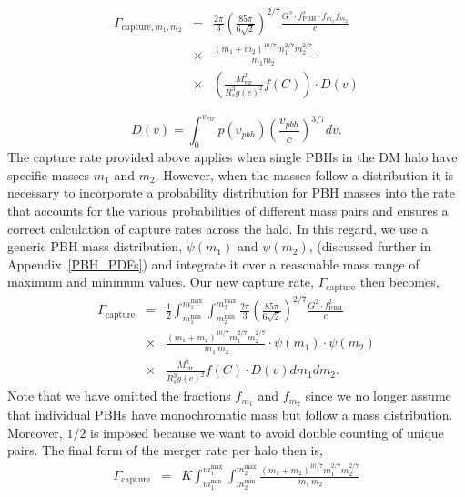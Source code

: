 \documentclass[aps, prd, reprint, nofootinbib]{revtex4-2}
\begin{document}
\begin{appendix}
\begin{eqnarray}
\Gamma_{\textrm{capture}, m_1, m_2} &=& 
\frac{2 \pi}{3}\left(\frac{85\pi}{6\sqrt{2}}\right)^{2/7} \frac{G^2 \cdot f_{\textrm{PBH}}^2 \cdot f_{m_1} f_{m_2}}{c} 
 \nonumber \\
&\times& \frac{(m_1+m_2)^{10/7}m_1^{2/7}m_2^{2/7}}{m_1 m_2} \cdot 
\nonumber \\
&\times& \left(\frac{M_{\textrm{vir}}^2}{R_s^3 g(c)^2}f(C)\right) \cdot D(v)
\end{eqnarray}

\begin{equation}
D(v)=\int_0^{v_{v i r}} p(v_{pbh})\left(\frac{ v_{pbh}}{c}\right)^{3 / 7} d v.
\end{equation}
The capture rate provided above applies when single PBHs  in the DM halo have specific masses $m_1$ and $m_2$. However, when the masses follow a distribution it is necessary to incorporate a probability distribution for PBH masses into the rate that accounts for the various probabilities of different mass pairs and ensures a correct calculation of capture rates across the halo. In this regard, we use a generic PBH mass distribution, $\psi(m_{1})$ and $\psi(m_{2})$, (discussed further in Appendix~\ref{PBH_PDFs}) and integrate it over a reasonable mass range of maximum and minimum values. Our new capture  rate, $\Gamma_{\textrm{capture}}$ then becomes,
\begin{eqnarray}
\Gamma_{\textrm{capture}} &=&\frac{1}{2}\int_{m_{1}^{\textrm{min}}}^{m_{1}^{\textrm{max}}} \int_{m_{2}^{\textrm{min}}}^{m_{2}^{\textrm{max}}} \frac{2\pi}{3} \left(\frac{85 \pi}{6 \sqrt{2}}\right)^{2 / 7} \frac{G^2 \cdot f_{\textrm{PBH}}^2  }{c} \nonumber \\
&\times& \frac{(m_1+m_2)^{10 / 7} m_1^{2 / 7} m_2^{2 / 7}}{ \, m_1 \, m_2} \cdot \psi(m_1) \cdot \psi(m_2) 
 \nonumber \\
&\times&
\frac{M_{\textrm{vir}}^2}{R_s^3 g(c)^2} f(C) \cdot D(v)  dm_1  dm_2.
\end{eqnarray}
Note that we have omitted the fractions $f_{m_1}$ and $f_{m_2}$ since we no longer assume that individual PBHs have monochromatic mass but follow a mass distribution. Moreover, $1/2$ is imposed because we want to avoid double counting of unique pairs.
The final form of the merger rate per halo then is,
\begin{eqnarray}
\Gamma_{\textrm{capture}} &=&K\int_{m_{1}^{\textrm{min}}}^{m_{1}^{\textrm{max}}} \int_{m_{2}^{\textrm{min}}}^{m_{2}^{\textrm{max}}} 
\frac{(m_1+m_2)^{10 / 7} m_1^{2 / 7} m_2^{2 / 7}}{ \, m_1 \, m_2}  \nonumber \\

\end{eqnarray}
\end{appendix}
\end{document}
